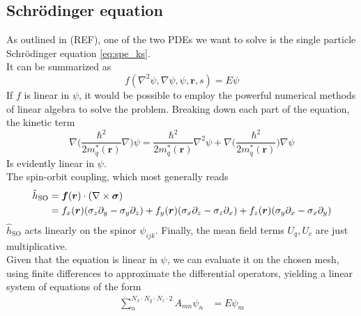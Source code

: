 \subsection{Schr\"odinger equation}
As outlined in (REF), one of the two PDEs we want to solve is the single particle Schr\"odinger equation \ref{eq:spe_ks}.
\\It can be summarized as
\begin{equation}
    \label{eq:pde} f(\nabla^2 \psi, \nabla \psi, \psi, \bm r, s) = E\psi
\end{equation}
If $f$ is linear in $\psi$, it would be possible to employ the powerful numerical methods of linear algebra to solve the problem.
Breaking down each part of the equation, the kinetic term
\begin{equation}
\label{eq:kin_lin_dim}
\nabla\bigg(\frac{\hbar^2}{2m^{*}_q(\mathbf r)}\nabla \bigg)\psi = \frac{\hbar^2}{2m^{*}_q(\mathbf r)} \nabla^2\psi + \nabla\bigg(\frac{\hbar^2}{2m^{*}_q(\mathbf r)}\bigg) \nabla\psi
\end{equation}
Is evidently linear in $\psi$. 
\\The spin-orbit coupling, which most generally reads
\begin{align*}
    \hat {{h}}_{\text{SO}}&=\bm f (\bm r )\cdot (\nabla \times \boldsymbol{\sigma} ) 
    \\&=f_x(\bm r)(\sigma_z\partial_y - \sigma_y\partial_z) + f_y(\bm r)(\sigma_x\partial_z - \sigma_z\partial_x) + f_z(\bm r)(\sigma_y\partial_x - \sigma_x\partial_y)
\end{align*}
$\hat {h}_\text{SO}$ acts linearly on the spinor $\psi_{ijk}$.
Finally, the mean field terms $U_q, U_c$ are just multiplicative.
\\Given that the equation is linear in $\psi$, we can evaluate it on the chosen mesh, using finite differences to approximate the differential operators, yielding a linear system of equations of the form
\begin{align}
    \sum_n^{N_x\cdot N_y\cdot N_z \cdot 2} A_{mn}\psi_{n} &= E\psi_m
\end{align}
